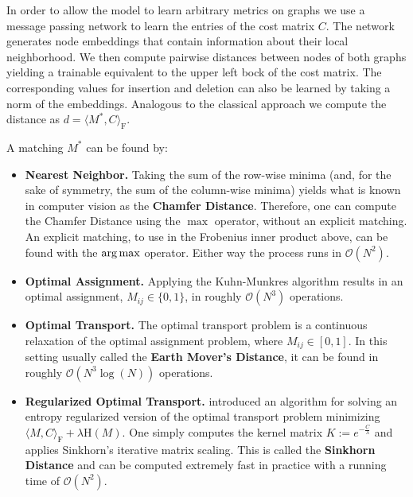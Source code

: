 In order to allow the model to learn arbitrary metrics on graphs we use a message passing network to learn the entries of the cost matrix $C$. The network generates node embeddings that contain information about their local neighborhood. We then compute pairwise distances between nodes of both graphs yielding a trainable equivalent to the upper left bock of the cost matrix. The corresponding values for insertion and deletion can also be learned by taking a norm of the embeddings. Analogous to the classical approach we compute the distance as $ d = \langle M^*, C \rangle_\mathrm{F} $.

A matching $M^*$ can be found by:
\begin{itemize}
     \itemsep0em
     \item \textbf{Nearest Neighbor.} Taking the sum of the row-wise minima (and, for the sake of symmetry, the sum of the column-wise minima) yields what is known in computer vision as the \textbf{Chamfer Distance}. Therefore, one can compute the Chamfer Distance using the $\max$ operator, without an explicit matching. An explicit matching, to use in the Frobenius inner product above, can be found with the $\operatorname*{arg\,max}$ operator. Either way the process runs in $\mathcal{O}(N^2)$.
     \item \textbf{Optimal Assignment.} Applying the Kuhn-Munkres algorithm results in an optimal assignment, $M_{ij} \in \{0,1\}$, in roughly $\mathcal{O}(N^3)$ operations.
     \item \textbf{Optimal Transport.} The optimal transport problem is a continuous relaxation of the optimal assignment problem, where $M_{ij} \in \left[ 0,1 \right]$. In this setting usually called the \textbf{Earth Mover's Distance}, it can be found in roughly $\mathcal{O}(N^3 \log(N))$ operations.
     \item \textbf{Regularized Optimal Transport.} \cite{sinkhorn2013} introduced an algorithm for solving an entropy regularized version of the optimal transport problem minimizing $\langle M, C \rangle_\mathrm{F} + \lambda \mathrm{H}(M)$. One simply computes the kernel matrix $ K := e^{-\frac{C}{\lambda}}$ and applies Sinkhorn’s iterative matrix scaling. This is called the \textbf{Sinkhorn Distance} and can be computed extremely fast in practice with a running time of $\mathcal{O}(N^2)$.
\end{itemize}

